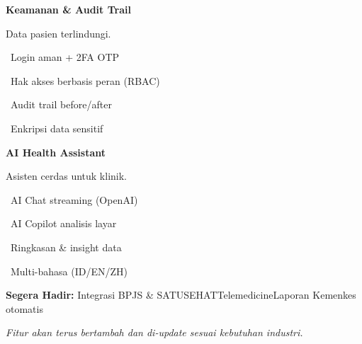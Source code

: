 \documentclass[a4paper]{article}
\begin{document}
\noindent
\begin{minipage}[t]{0.485\textwidth}
    \colorbox{OrangePrimary}{%
        \begin{minipage}{\dimexpr\textwidth-2\fboxsep\relax}
            {\fontsize{10}{13}\selectfont\bfseries\color{White} Keamanan \& Audit Trail}
        \end{minipage}}\par
    \vspace{4pt}
    {\fontsize{9}{12}\selectfont\color{TextDark}%
    Data pasien terlindungi.\par\vspace{3pt}
    \textbullet\ Login aman + 2FA OTP\par\vspace{2pt}%
    \textbullet\ Hak akses berbasis peran (RBAC)\par\vspace{2pt}%
    \textbullet\ Audit trail before/after\par\vspace{2pt}%
    \textbullet\ Enkripsi data sensitif}%

\end{minipage}%
\hfill
\begin{minipage}[t]{0.485\textwidth}
    \colorbox{EmeraldDark}{%
        \begin{minipage}{\dimexpr\textwidth-2\fboxsep\relax}
            {\fontsize{10}{13}\selectfont\bfseries\color{White} AI Health Assistant}
        \end{minipage}}\par
    \vspace{4pt}
    {\fontsize{9}{12}\selectfont\color{TextDark}%
    Asisten cerdas untuk klinik.\par\vspace{3pt}
    \textbullet\ AI Chat streaming (OpenAI)\par\vspace{2pt}%
    \textbullet\ AI Copilot analisis layar\par\vspace{2pt}%
    \textbullet\ Ringkasan \& insight data\par\vspace{2pt}%
    \textbullet\ Multi-bahasa (ID/EN/ZH)}%

\end{minipage}

\vspace{8pt}

{\setlength{\fboxsep}{8pt}\setlength{\fboxrule}{0pt}%
\noindent\colorbox{BlueBg}{%
    \begin{minipage}{\dimexpr\textwidth-2\fboxsep\relax}
        {\fontsize{9}{12}\selectfont\bfseries\color{BlueDark} Segera Hadir:}\enspace
        {\fontsize{9}{12}\selectfont\color{TextDark} Integrasi BPJS \& SATUSEHAT\enspace\textcolor{BluePrimary}{\textbullet}\enspace Telemedicine\enspace\textcolor{BluePrimary}{\textbullet}\enspace Laporan Kemenkes otomatis}\par\vspace{3pt}
        {\fontsize{8.5}{11}\selectfont\color{TextLight}\textit{Fitur akan terus bertambah dan di-update sesuai kebutuhan industri.}}
    \end{minipage}}}
\end{document}
